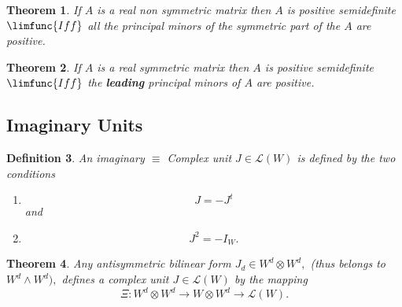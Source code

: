 \documentclass[aps,preprint]{revtex4}
\newtheorem{theorem}{Theorem}
\newtheorem{definition}[theorem]{Definition}
\begin{document}
\begin{theorem}
If $A$ is a real non symmetric matrix then $A$ is positive semidefinite $%
\limfunc{Iff}$ all the principal minors of the symmetric part of the $A$ are
positive.
\end{theorem}

\begin{theorem}
If $A$ is a real symmetric matrix then $A$ is positive semidefinite $%
\limfunc{Iff}$ the \textbf{leading }principal minors of $A$ are positive.
\end{theorem}

\subsection{Imaginary Units}

\begin{definition}
An imaginary $\equiv $ Complex unit $J\in \mathcal{L}\left( W\right) $ is
defined by the two conditions

\begin{enumerate}
\item 
\begin{equation}
J=-J^{t}
\end{equation}%
and

\item 
\begin{equation}
J^{2}=-I_{W}.
\end{equation}
\end{enumerate}
\end{definition}

\begin{theorem}
Any antisymmetric bilinear form $J_{d}\in W^{d}\otimes W^{d},$ (thus belongs
to $W^{d}\wedge W^{d}),$ defines a complex unit $J\in \mathcal{L}\left(
W\right) $ by the mapping 
\begin{equation}
\Xi :W^{d}\otimes W^{d}\rightarrow W\otimes W^{d}\rightarrow \mathcal{L}%
\left( W\right) .
\end{equation}
\end{theorem}
\end{document}
